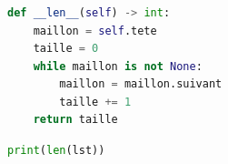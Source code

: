 \documentclass[svgnames,11pt]{beamer}
\begin{document}
\begin{frame}[fragile]
    \frametitle{}

    \begin{center}
        \begin{lstlisting}[language=Python , basicstyle=\ttfamily\small, xleftmargin=2em, xrightmargin=2em]
def __len__(self) -> int:
    maillon = self.tete
    taille = 0
    while maillon is not None:
        maillon = maillon.suivant
        taille += 1
    return taille
\end{lstlisting}
    \end{center}
    \begin{center}
        \begin{lstlisting}[language=Python , basicstyle=\ttfamily\small, xleftmargin=2em, xrightmargin=2em]
print(len(lst))
\end{lstlisting}
        \label{CODE}
    \end{center}
\end{frame}
\end{document}
